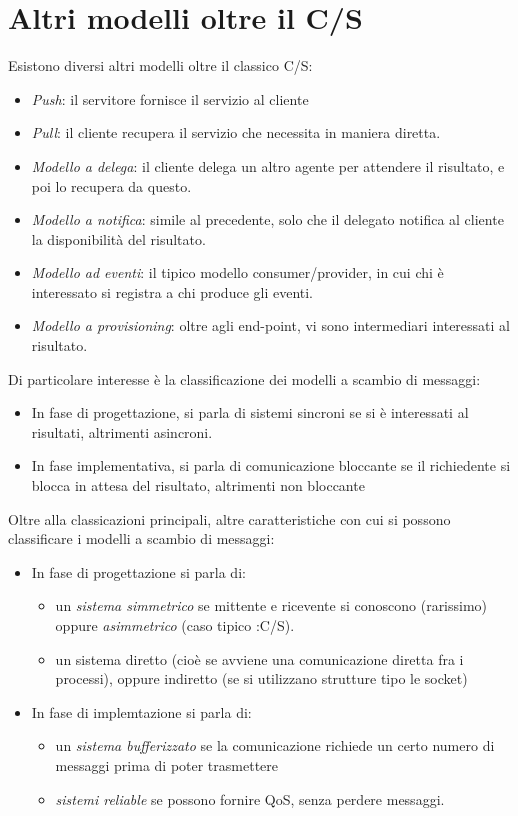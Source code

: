 \section{Altri modelli oltre il C/S}
Esistono diversi altri modelli oltre il classico C/S:
\begin{itemize}
 \item \textit{Push}: il servitore fornisce il servizio al cliente
 \item \textit{Pull}: il cliente recupera il servizio che necessita in maniera
 diretta.
 \item \textit{Modello a delega}: il cliente delega un altro agente per
 attendere il risultato, e poi lo recupera da questo.
 \item \textit{Modello a notifica}: simile al precedente, solo che il delegato
 notifica al cliente la disponibilità del risultato.
 \item \textit{Modello ad eventi}: il tipico modello consumer/provider, in cui chi è interessato si registra a chi
 produce gli eventi.
 \item \textit{Modello a provisioning}: oltre agli end-point, vi sono intermediari interessati al risultato.
\end{itemize}
Di particolare interesse è la classificazione dei modelli a scambio di messaggi:
\begin{itemize}
 \item In fase di progettazione, si parla di sistemi sincroni se si è interessati al risultati, altrimenti asincroni.
 \item In fase implementativa, si parla di comunicazione bloccante se il richiedente si blocca in attesa del risultato,
 altrimenti non bloccante
\end{itemize}
Oltre alla classicazioni principali, altre caratteristiche con cui si possono classificare i modelli a scambio di
messaggi:
\begin{itemize}
 \item In fase di progettazione si parla di:
 \begin{itemize}
  \item un \textit{sistema simmetrico} se mittente e ricevente si conoscono
  (rarissimo) oppure \textit{asimmetrico} (caso tipico :C/S).
  \item un sistema diretto (cioè se avviene una comunicazione diretta fra i
  processi), oppure indiretto (se si utilizzano strutture tipo le socket)
 \end{itemize}
 \item In fase di implemtazione si parla di:
 \begin{itemize}
  \item un \textit{sistema bufferizzato} se la comunicazione richiede un certo
  numero di messaggi prima di poter trasmettere
  \item \textit{sistemi reliable} se possono fornire QoS, senza perdere
  messaggi.
 \end{itemize}
\end{itemize}

